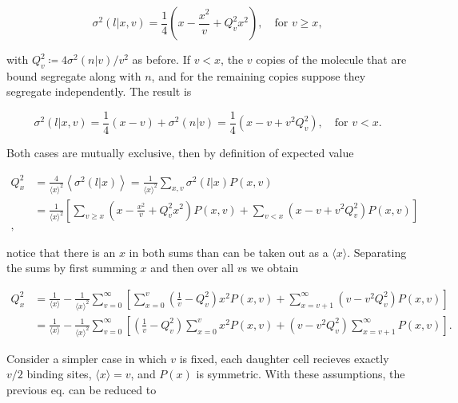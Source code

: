 \begin{equation*}
  \sigma^2(l|x,v) =\frac{1}{4}\left(x-\frac{x^2}{v}+Q_v^2x^2\right),\quad \text{for } v\geq x,
\end{equation*}

with $Q_v^2 \coloneqq 4\sigma^2(n|v)/v^2$ as before. If $v<x$, the $v$ copies of the molecule that are bound segregate along with $n$, and for the remaining copies suppose they segregate independently. The result is

\begin{equation*}
  \sigma^2(l|x,v) = \frac{1}{4}(x-v) + \sigma^2(n|v) = \frac{1}{4}\left(x-v+v^2Q_v^2\right),\quad \text{for } v<x.
\end{equation*}

Both cases are mutually exclusive, then by definition of expected value

\begin{equation*}
  \begin{split}
    Q_x^2 &= \frac{4}{\langle x\rangle^2}\left\langle\sigma^2(l|x)\right\rangle = \frac{1}{\langle x\rangle^2}\sum_{x,v}\sigma^2(l|x)P(x,v)\\
    &=\frac{1}{\langle x\rangle^2}\left[\sum_{v\geq x}\left(x-\frac{x^2}{v}+Q_v^2x^2\right)P(x,v) + \sum_{v<x}\left(x-v+v^2Q_v^2\right)P(x,v)\right]\\,
  \end{split}
\end{equation*}

notice that there is an $x$ in both sums than can be taken out as a $\langle x\rangle$. Separating the sums by first summing $x$ and then over all $v$s we obtain

\begin{equation*}
  \begin{split}
     Q_x^2 &= \frac{1}{\langle x\rangle} - \frac{1}{\langle x\rangle^2}\sum_{v=0}^\infty\left[\sum_{x=0}^v\left(\frac{1}{v}-Q_v^2\right)x^2P(x,v)+\sum_{x=v+1}^\infty\left(v-v^2Q_v^2\right)P(x,v)\right]\\
     &=\frac{1}{\langle x\rangle} - \frac{1}{\langle x\rangle^2}\sum_{v=0}^\infty\left[\left(\frac{1}{v}-Q_v^2\right)\sum_{x=0}^vx^2P(x,v)+\left(v-v^2Q_v^2\right)\sum_{x=v+1}^\infty P(x,v)\right].
  \end{split}
\end{equation*}

Consider a simpler case in which $v$ is fixed, each daughter cell recieves exactly $v/2$ binding sites, $\langle x\rangle = v$, and $P(x)$ is symmetric. With these assumptions, the previous eq. can be reduced to

